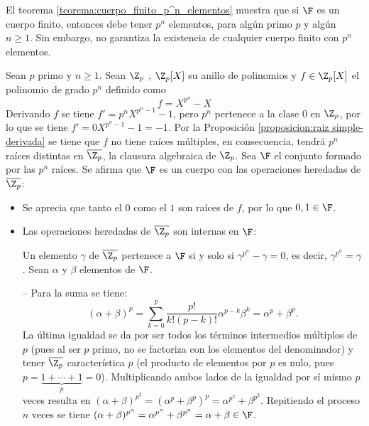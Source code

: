 El teorema \ref{teorema:cuerpo_finito_p^n_elementos} muestra que si $\F$ es un cuerpo finito, entonces debe tener $p^n$ elementos, para algún primo $p$ y algún $n\geq1$. Sin embargo, no garantiza la existencia de cualquier cuerpo finito con $p^n$ elementos.

 
\begin{teorema}\label{teorema:existencia_cuerpo}\end{teorema}

\begin{dem}{\cite[p.~416]{GamboaAnillos}}
    Sean $p$ primo y $n\geq1$. Sean $\Z_p$ , $\Z_p[X]$ su anillo de polinomios y $f\in \Z_p[X]$ el polinomio de grado $p^n$ definido como \[f = X^{p^n}-X\]
    Derivando $f$ se tiene $f' = p^nX^{p^n-1}-1$, pero $p^n$ pertenece a la clase $0$ en $\Z_p$, por lo que se tiene $f' = 0X^{p^n-1}-1 = -1$. Por la Proposición \ref{proposicion:raiz simple-derivada} se tiene que $f$ no tiene raíces múltiples, en consecuencia, tendrá $p^n$ raíces distintas en $\overline{\Z_p}$, la clausura algebraica de $\Z_p$. Sea $\F$ el conjunto formado por las $p^n$ raíces. Se afirma que $\F$ es un cuerpo con las operaciones heredadas de $\overline{\Z_p}$: 
    \begin{itemize}
        \item Se aprecia que tanto el $0$ como el $1$ son raíces de $f$, por lo que $0,1\in \F$.
        \item Las operaciones heredadas de $\overline{\Z_p}$ son internas en $\F$:
        
        Un elemento $\gamma$ de $\overline{\Z_p}$ pertenece a $\F$ si y solo si $\gamma^{p^n} - \gamma = 0$, es decir, $\gamma^{p^n} = \gamma$. Sean $\alpha$ y $\beta$ elementos de $\F$.
        
        -- Para la suma se tiene:
        \[
        (\alpha + \beta)^p = \sum_{k=0}^p \frac{p!}{k!(p-k)!} \alpha^{p-k}\beta^k = \alpha^p + \beta^p.
        \]
        La última igualdad se da por ser todos los términos intermedios múltiplos de $p$ (pues al ser $p$ primo, no se factoriza con los elementos del denominador) y tener $\overline{\Z_p}$ característica $p$ (el producto de elementos por $p$ es nulo, pues $p =\underbrace{1 +  \cdots + 1}_{p} = 0$). Multiplicando ambos lados de la igualdad por sí mismo $p$ veces resulta en $(\alpha + \beta)^{p^2} = (\alpha^p + \beta^p)^p = \alpha^{p^2} + \beta^{p^2}$. Repitiendo el proceso $n$ veces se tiene $(\alpha + \beta)^{p^n} = \alpha^{p^n} + \beta^{p^n} = \alpha + \beta \in \F$.
        

\end{itemize}
\end{dem}
